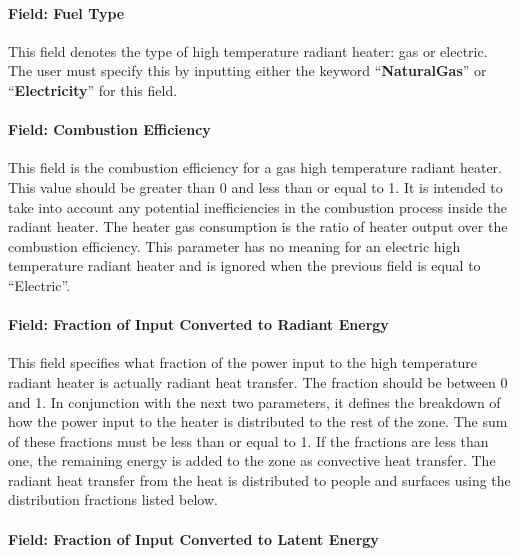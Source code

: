 \paragraph{Field: Fuel Type}\label{field-fuel-type-003}

This field denotes the type of high temperature radiant heater: gas or electric. The user must specify this by inputting either the keyword ``\textbf{NaturalGas}'' or ``\textbf{Electricity}'' for this field.

\paragraph{Field: Combustion Efficiency}\label{field-combustion-efficiency}

This field is the combustion efficiency for a gas high temperature radiant heater. This value should be greater than 0 and less than or equal to 1. It is intended to take into account any potential inefficiencies in the combustion process inside the radiant heater. The heater gas consumption is the ratio of heater output over the combustion efficiency. This parameter has no meaning for an electric high temperature radiant heater and is ignored when the previous field is equal to ``Electric''.

\paragraph{Field: Fraction of Input Converted to Radiant Energy}\label{field-fraction-of-input-converted-to-radiant-energy}

This field specifies what fraction of the power input to the high temperature radiant heater is actually radiant heat transfer. The fraction should be between 0 and 1. In conjunction with the next two parameters, it defines the breakdown of how the power input to the heater is distributed to the rest of the zone. The sum of these fractions must be less than or equal to 1. If the fractions are less than one, the remaining energy is added to the zone as convective heat transfer. The radiant heat transfer from the heat is distributed to people and surfaces using the distribution fractions listed below.

\paragraph{Field: Fraction of Input Converted to Latent Energy}\label{field-fraction-of-input-converted-to-latent-energy}

